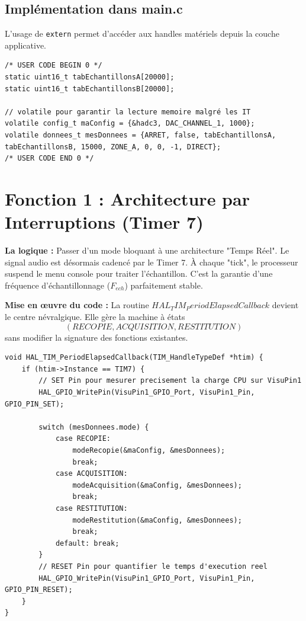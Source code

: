 \documentclass{article}
\begin{document}
\subsection{Implémentation dans main.c}
L'usage de \texttt{extern} permet d'accéder aux handles matériels depuis la couche applicative.

\begin{lstlisting}[caption={Initialisation globale dans main.c}]
/* USER CODE BEGIN 0 */
static uint16_t tabEchantillonsA[20000];
static uint16_t tabEchantillonsB[20000];

// volatile pour garantir la lecture memoire malgré les IT
volatile config_t maConfig = {&hadc3, DAC_CHANNEL_1, 1000};
volatile donnees_t mesDonnees = {ARRET, false, tabEchantillonsA, tabEchantillonsB, 15000, ZONE_A, 0, 0, -1, DIRECT};
/* USER CODE END 0 */
\end{lstlisting}

\section{Fonction 1 : Architecture par Interruptions (Timer 7)}

\textbf{La logique :} Passer d'un mode bloquant à une architecture "Temps Réel". Le signal audio est désormais cadencé par le Timer 7. À chaque "tick", le processeur suspend le menu console pour traiter l'échantillon. C'est la garantie d'une fréquence d'échantillonnage ($F_{ech}$) parfaitement stable.

\textbf{Mise en œuvre du code :}
La routine $HAL_TIM_PeriodElapsedCallback$ devient le centre névralgique. Elle gère la machine à états $$(RECOPIE, ACQUISITION, RESTITUTION)$$ sans modifier la signature des fonctions existantes.

\begin{lstlisting}[caption={Callback de traitement audio dans enregistreur.c}]
void HAL_TIM_PeriodElapsedCallback(TIM_HandleTypeDef *htim) {
    if (htim->Instance == TIM7) {
        // SET Pin pour mesurer precisement la charge CPU sur VisuPin1
        HAL_GPIO_WritePin(VisuPin1_GPIO_Port, VisuPin1_Pin, GPIO_PIN_SET); 

        switch (mesDonnees.mode) {
            case RECOPIE: 
                modeRecopie(&maConfig, &mesDonnees); 
                break;
            case ACQUISITION: 
                modeAcquisition(&maConfig, &mesDonnees); 
                break;
            case RESTITUTION: 
                modeRestitution(&maConfig, &mesDonnees); 
                break;
            default: break;
        }
        // RESET Pin pour quantifier le temps d'execution reel
        HAL_GPIO_WritePin(VisuPin1_GPIO_Port, VisuPin1_Pin, GPIO_PIN_RESET); 
    }
}
\end{lstlisting}
\end{document}
